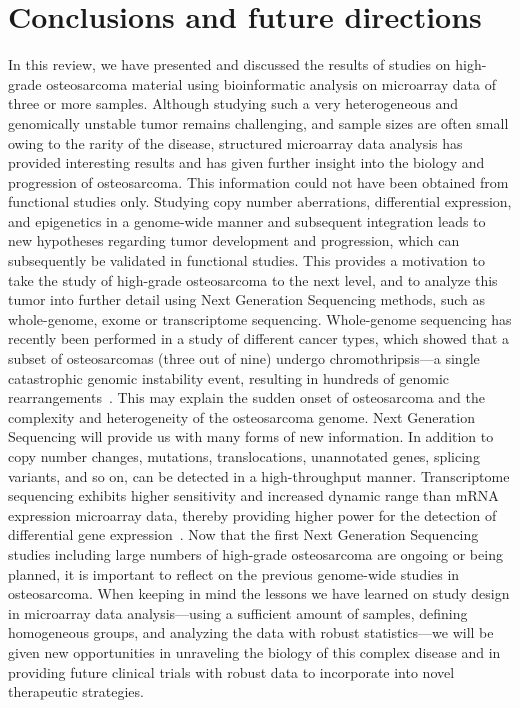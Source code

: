 \section{Conclusions and future directions}\label{conclusions2}
In this review, we have presented and discussed the results of
studies on high\hyp{}grade osteosarcoma material using bioinformatic
analysis on microarray data of three or more samples.
Although studying such a very heterogeneous and genomically
unstable tumor remains challenging, and sample sizes
are often small owing to the rarity of the disease, structured
microarray data analysis has provided interesting results and
has given further insight into the biology and progression of
osteosarcoma. This information could not have been obtained
from functional studies only. Studying copy number aberrations,
differential expression, and epigenetics in a genome\hyp{}wide
manner and subsequent integration leads to new
hypotheses regarding tumor development and progression,
which can subsequently be validated in functional studies.
This provides a motivation to take the study of high\hyp{}grade
osteosarcoma to the next level, and to analyze this tumor
into further detail using Next Generation Sequencing methods,
such as whole\hyp{}genome, exome or transcriptome sequencing.
Whole\hyp{}genome sequencing has recently been performed
in a study of different cancer types, which showed that a subset
of osteosarcomas (three out of nine) undergo chromothripsis---a
single catastrophic genomic instability event,
resulting in hundreds of genomic rearrangements~\cite{stephens2011massive}. This may
explain the sudden onset of osteosarcoma and the complexity
and heterogeneity of the osteosarcoma genome. Next Generation
Sequencing will provide us with many forms of new information.
In addition to copy number changes, mutations,
translocations, unannotated genes, splicing variants, and so
on, can be detected in a high\hyp{}throughput manner. Transcriptome
sequencing exhibits higher sensitivity and increased
dynamic range than mRNA expression microarray data,
thereby providing higher power for the detection of differential
gene expression~\cite{oshlack2010rna}. Now that the first Next Generation
Sequencing studies including large numbers of high\hyp{}grade osteosarcoma
are ongoing or being planned, it is important to
reflect on the previous genome\hyp{}wide studies in osteosarcoma.
When keeping in mind the lessons we have learned on study
design in microarray data analysis---using a sufficient amount
of samples, defining homogeneous groups, and analyzing the
data with robust statistics---we will be given new opportunities
in unraveling the biology of this complex disease and in
providing future clinical trials with robust data to incorporate
into novel therapeutic strategies.

